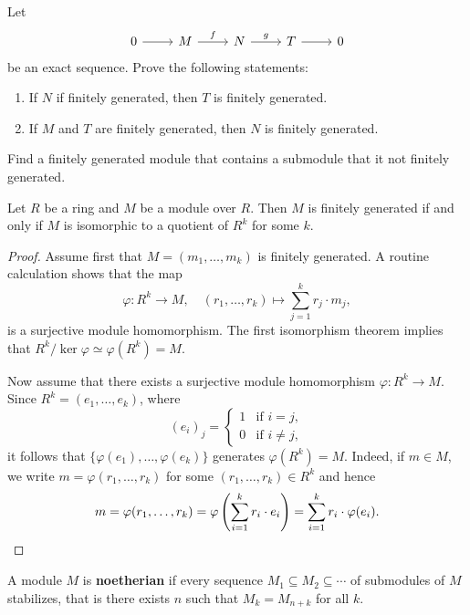 \begin{exercise}
	Let 
\[\begin{tikzcd}
	0 & M & N & T & 0
	\arrow[from=1-1, to=1-2]
	\arrow["f", from=1-2, to=1-3]
	\arrow["g", from=1-3, to=1-4]
	\arrow[from=1-4, to=1-5]
\end{tikzcd}
\]
     be an exact sequence. Prove the following statements: 
     \begin{enumerate}
     \item If $N$ if finitely generated, then $T$ is finitely generated. 
     \item If $M$ and $T$ are finitely generated, then $N$ is finitely generated. 	
     \end{enumerate}
\end{exercise}

Find a finitely generated module that contains a submodule that 
it not finitely generated. 

\begin{proposition}
    Let $R$ be a ring and $M$ be a module over $R$. 
    Then $M$ is finitely generated if and only 
    if $M$ is isomorphic to a quotient of $R^k$ for some $k$.
\end{proposition}

\begin{proof}
    Assume first that $M=(m_1,\dots,m_k)$ is finitely generated. A routine calculation shows that
    the map
    \[
    \varphi\colon R^k\to M,\quad
    (r_1,\dots,r_k)\mapsto \sum_{j=1}^kr_j\cdot m_j,
    \]
    is a surjective module homomorphism. The first isomorphism theorem implies that 
    $R^k/\ker\varphi\simeq\varphi(R^k)=M$. 
    
    Now assume that there exists a 
    surjective module homomorphism $\varphi\colon R^k\to M$. Since 
    $R^k=(e_1,\dots,e_k)$, where 
    \[
    (e_i)_j=\begin{cases}
    1 & \text{if $i=j$},\\
    0 & \text{if $i\ne j$},
    \end{cases}
    \]
    it follows that $\{\varphi(e_1),\dots,\varphi(e_k)\}$ generates $\varphi(R^k)=M$. Indeed, 
    if $m\in M$, we write $m=\varphi(r_1,\dots,r_k)$ for some $(r_1,\dots,r_k)\in R^k$ 
    and hence 
    \[
    m=\varphi(r_1,\dots,r_k)=\varphi\left(\sum_{i=1}^k r_i\cdot e_i\right)
    =\sum_{i=1}^kr_i\cdot\varphi(e_i).\qedhere
    \]
\end{proof}

\begin{definition}
    A module $M$ is \textbf{noetherian} if every sequence $M_1\subseteq M_2\subseteq\cdots$ of submodules of $M$ 
    stabilizes, that is there exists $n$ such that $M_k=M_{n+k}$ for all $k$. 	
\end{definition}

